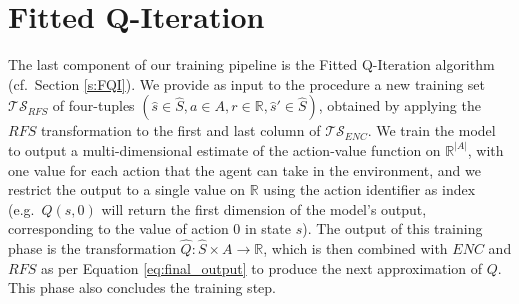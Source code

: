 \section{Fitted Q-Iteration}
The last component of our training pipeline is the Fitted Q-Iteration algorithm 
(cf.\ Section \ref{s:FQI}).
We provide as input to the procedure a new training set $\mathcal{TS}_{RFS}$
of four-tuples $(\hat{s} \in \hat{S}, a \in A, r \in \mathbb{R}, \hat{s}' \in \hat{S})$, 
obtained by applying the $RFS$ transformation to the first and last column of 
$\mathcal{TS}_{ENC}$. 
We train the model to output a multi-dimensional estimate of the action-value
function on $\mathbb{R}^{|A|}$, with one value for each action that the agent 
can take in the environment, and we restrict the output to a single value on 
$\mathbb{R}$ using the action identifier as index (e.g.\ $Q(s, 0)$ will return 
the first dimension of the model's output, corresponding to the value of action
0 in state $s$). 
The output of this training phase is the transformation 
$\hat{Q}: \hat{S} \times A \rightarrow \mathbb{R}$, which is then combined with 
$ENC$ and $RFS$ as per Equation \eqref{eq:final_output} to produce the next
approximation of $Q$. This phase also concludes the training step.


